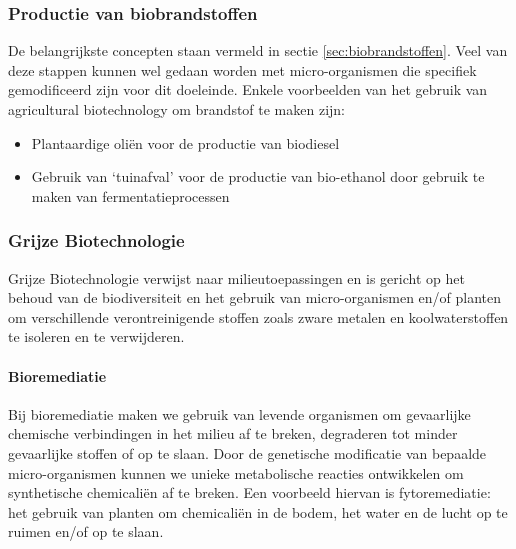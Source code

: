 \documentclass[a4paper,kul]{kulakarticle} %
\begin{document}
\subsubsection{Productie van biobrandstoffen}
De belangrijkste concepten staan vermeld in sectie \ref{sec:biobrandstoffen}. Veel van deze stappen kunnen wel gedaan worden met micro-organismen die specifiek gemodificeerd zijn voor dit doeleinde. Enkele voorbeelden van het gebruik van agricultural biotechnology om brandstof te maken zijn:
\begin{itemize}
	\item Plantaardige oliën voor de productie van
	biodiesel
	\item Gebruik van `tuinafval' voor de productie
	van bio-ethanol door gebruik te maken van
	fermentatieprocessen
\end{itemize}
\subsubsection{Grijze Biotechnologie}
Grijze Biotechnologie verwijst naar milieutoepassingen en is gericht op het behoud van de biodiversiteit en het gebruik van micro-organismen en/of planten om verschillende verontreinigende stoffen zoals zware metalen en koolwaterstoffen te isoleren en te verwijderen. 
\paragraph{Bioremediatie}
Bij bioremediatie maken we gebruik van levende organismen om gevaarlijke chemische verbindingen in het milieu af te breken, degraderen tot minder gevaarlijke stoffen of op te slaan. Door de genetische modificatie van bepaalde micro-organismen kunnen we unieke metabolische reacties ontwikkelen om synthetische chemicaliën af te breken. Een voorbeeld hiervan is fytoremediatie: het gebruik van planten om chemicaliën in de bodem, het water en de lucht op te ruimen en/of op te slaan. 
\end{document}
